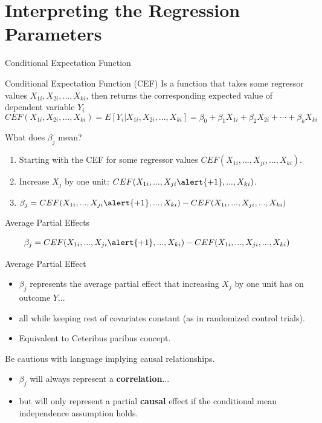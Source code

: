 \documentclass[11pt, aspectratio = 169]{beamer}
\begin{document}
\section{Interpreting the Regression Parameters} 

\begin{frame}{Conditional Expectation Function}
\begin{block}{Conditional Expectation Function (CEF)}
    Is a function that takes some regressor values $X_{1i}, X_{2i}, ..., X_{ki}$, then returns the corresponding expected value of dependent variable $Y_i$
    $$
    CEF(X_{1i}, X_{2i}, ..., X_{ki}) = E[Y_i | X_{1i}, X_{2i}, ..., X_{ki}] = \beta_0 + \beta_1 X_{1i} + \beta_2 X_{2i} + \cdots + \beta_k X_{ki}
    $$
\end{block}
\pause
What does $\beta_j$ mean?
\begin{enumerate}
    \item Starting with the CEF for some regressor values $CEF(X_{1i}, ..., X_{ji}, ..., X_{ki})$.
    \item Increase $X_j$ by one unit: $CEF(X_{1i}, ..., X_{ji}\alert{+1}, ..., X_{ki})$.
    \item $\beta_j = CEF(X_{1i}, ..., X_{ji}\alert{+1}, ..., X_{ki}) - CEF(X_{1i}, ..., X_{ji}, ..., X_{ki})$
\end{enumerate}
\end{frame}

\begin{frame}{Average Partial Effects}

$$\beta_j = CEF(X_{1i}, ..., X_{ji}\alert{+1}, ..., X_{ki}) - CEF(X_{1i}, ..., X_{ji}, ..., X_{ki})$$

\begin{block}{Average Partial Effect}
    \begin{itemize}
    \item $\beta_j$ represents the \alert{average partial effect} that increasing $X_j$ by one unit has on outcome $Y$... 
    \item all while keeping rest of covariates constant (as in randomized control trials).
    \item Equivalent to Ceteribus paribus concept.
    \end{itemize}
\end{block}
\pause
Be cautious with language implying causal relationships. 
\begin{itemize}
    \item $\beta_j$ will always represent a \textbf{correlation}... \pause
    \item but will only represent a partial \textbf{causal} effect if the conditional mean independence assumption holds. 
\end{itemize}
\end{frame}
\end{document}
